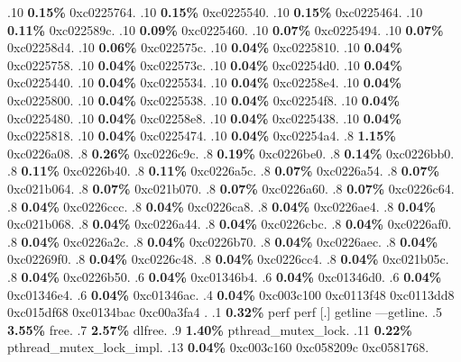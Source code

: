 \begin{profile}
{.10 \textbf{0.15\%} 0xc0225764. 
.10 \textbf{0.15\%} 0xc0225540. 
.10 \textbf{0.15\%} 0xc0225464. 
.10 \textbf{0.11\%} 0xc022589c. 
.10 \textbf{0.09\%} 0xc0225460. 
.10 \textbf{0.07\%} 0xc0225494. 
.10 \textbf{0.07\%} 0xc02258d4. 
.10 \textbf{0.06\%} 0xc022575c. 
.10 \textbf{0.04\%} 0xc0225810. 
.10 \textbf{0.04\%} 0xc0225758. 
.10 \textbf{0.04\%} 0xc022573c. 
.10 \textbf{0.04\%} 0xc02254d0. 
.10 \textbf{0.04\%} 0xc0225440. 
.10 \textbf{0.04\%} 0xc0225534. 
.10 \textbf{0.04\%} 0xc02258e4. 
.10 \textbf{0.04\%} 0xc0225800. 
.10 \textbf{0.04\%} 0xc0225538. 
.10 \textbf{0.04\%} 0xc02254f8. 
.10 \textbf{0.04\%} 0xc0225480. 
.10 \textbf{0.04\%} 0xc02258e8. 
.10 \textbf{0.04\%} 0xc0225438. 
.10 \textbf{0.04\%} 0xc0225818. 
.10 \textbf{0.04\%} 0xc0225474. 
.10 \textbf{0.04\%} 0xc02254a4. 
.8 \textbf{1.15\%} 0xc0226a08. 
.8 \textbf{0.26\%} 0xc0226c9c. 
.8 \textbf{0.19\%} 0xc0226be0. 
.8 \textbf{0.14\%} 0xc0226bb0. 
.8 \textbf{0.11\%} 0xc0226b40. 
.8 \textbf{0.11\%} 0xc0226a5c. 
.8 \textbf{0.07\%} 0xc0226a54. 
.8 \textbf{0.07\%} 0xc021b064. 
.8 \textbf{0.07\%} 0xc021b070. 
.8 \textbf{0.07\%} 0xc0226a60. 
.8 \textbf{0.07\%} 0xc0226c64. 
.8 \textbf{0.04\%} 0xc0226ccc. 
.8 \textbf{0.04\%} 0xc0226ca8. 
.8 \textbf{0.04\%} 0xc0226ae4. 
.8 \textbf{0.04\%} 0xc021b068. 
.8 \textbf{0.04\%} 0xc0226a44. 
.8 \textbf{0.04\%} 0xc0226cbc. 
.8 \textbf{0.04\%} 0xc0226af0. 
.8 \textbf{0.04\%} 0xc0226a2c. 
.8 \textbf{0.04\%} 0xc0226b70. 
.8 \textbf{0.04\%} 0xc0226aec. 
.8 \textbf{0.04\%} 0xc02269f0. 
.8 \textbf{0.04\%} 0xc0226c48. 
.8 \textbf{0.04\%} 0xc0226cc4. 
.8 \textbf{0.04\%} 0xc021b05c. 
.8 \textbf{0.04\%} 0xc0226b50. 
.6 \textbf{0.04\%} 0xc01346b4. 
.6 \textbf{0.04\%} 0xc01346d0. 
.6 \textbf{0.04\%} 0xc01346e4. 
.6 \textbf{0.04\%} 0xc01346ac. 
.4 \textbf{0.04\%} 0xc003c100\newline {} 0xc0113f48\newline {} 0xc0113dd8\newline {} 0xc015df68\newline {} 0xc0134bac\newline {} 0xc00a3fa4\newline {} . 
.1 \textbf{ 0.32\%} perf             perf                   [.] getline\newline {} ---getline. 
.5 \textbf{3.55\%} free. 
.7 \textbf{2.57\%} dlfree. 
.9 \textbf{1.40\%} pthread\_mutex\_lock. 
.11 \textbf{0.22\%} pthread\_mutex\_lock\_impl. 
.13 \textbf{0.04\%} 0xc003c160\newline {} 0xc058209c\newline {} 0xc0581768. 
}
\end{profile}
